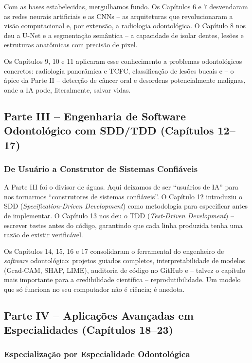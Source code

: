 Com as bases estabelecidas, mergulhamos fundo. Os Capítulos 6 e 7 desvendaram
as redes neurais artificiais e as CNNs -- as arquiteturas que revolucionaram a
visão computacional e, por extensão, a radiologia odontológica. O Capítulo 8
nos deu a U-Net e a segmentação semântica -- a capacidade de isolar dentes,
lesões e estruturas anatômicas com precisão de pixel.

Os Capítulos 9, 10 e 11 aplicaram esse conhecimento a problemas odontológicos
concretos: radiologia panorâmica e TCFC, classificação de lesões bucais e --
o ápice da Parte II -- detecção de câncer oral e desordens potencialmente
malignas, onde a IA pode, literalmente, salvar vidas.

\subsection{Parte III -- Engenharia de Software Odontológico com SDD/TDD (Capítulos 12--17)}

\subsubsection{De Usuário a Construtor de Sistemas Confiáveis}

A Parte III foi o divisor de águas. Aqui deixamos de ser ``usuários de IA''
para nos tornarmos ``construtores de sistemas confiáveis''. O Capítulo 12
introduziu o SDD (\textit{Specification-Driven Development}) como metodologia
para especificar antes de implementar. O Capítulo 13 nos deu o TDD
(\textit{Test-Driven Development}) -- escrever testes antes do código, garantindo
que cada linha produzida tenha uma razão de existir verificável.

Os Capítulos 14, 15, 16 e 17 consolidaram o ferramental do engenheiro de
\textit{software} odontológico: projetos guiados completos, interpretabilidade
de modelos (Grad-CAM, SHAP, LIME), auditoria de código no GitHub e -- talvez o
capítulo mais importante para a credibilidade científica -- reprodutibilidade.
Um modelo que só funciona no seu computador não é ciência; é anedota.

\subsection{Parte IV -- Aplicações Avançadas em Especialidades (Capítulos 18--23)}

\subsubsection{Especialização por Especialidade Odontológica}

